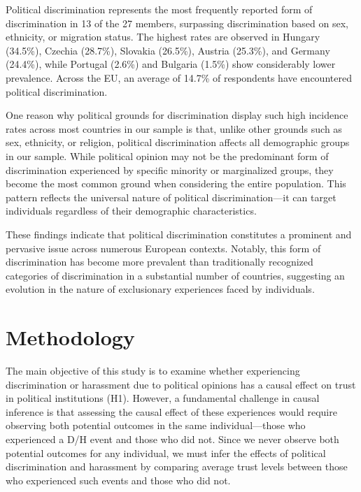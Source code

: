 \documentclass{article}
\begin{document}
Political discrimination represents the most frequently reported form of discrimination in 13 of the 27 members, surpassing discrimination based on sex, ethnicity, or migration status. The highest rates are observed in Hungary (34.5\%), Czechia (28.7\%), Slovakia (26.5\%), Austria (25.3\%), and Germany (24.4\%), while Portugal (2.6\%) and Bulgaria (1.5\%) show considerably lower prevalence. Across the EU, an average of 14.7\% of respondents have encountered political discrimination.

One reason why political grounds for discrimination display such high incidence rates across most countries in our sample is that, unlike other grounds such as sex, ethnicity, or religion, political discrimination affects all demographic groups in our sample. While political opinion may not be the predominant form of discrimination experienced by specific minority or marginalized groups, they become the most common ground when considering the entire population. This pattern reflects the universal nature of political discrimination—it can target individuals regardless of their demographic characteristics.

These findings indicate that political discrimination constitutes a prominent and pervasive issue across numerous European contexts. Notably, this form of discrimination has become more prevalent than traditionally recognized categories of discrimination in a substantial number of countries, suggesting an evolution in the nature of exclusionary experiences faced by individuals.



\section{Methodology}

The main objective of this study is to examine whether experiencing discrimination or harassment due to political opinions has a causal effect on trust in political institutions (H1). However, a fundamental challenge in causal inference is that assessing the causal effect of these experiences would require observing both potential outcomes in the same individual—those who experienced a D/H event and those who did not. Since we never observe both potential outcomes for any individual, we must infer the effects of political discrimination and harassment by comparing average trust levels between those who experienced such events and those who did not.
\end{document}
